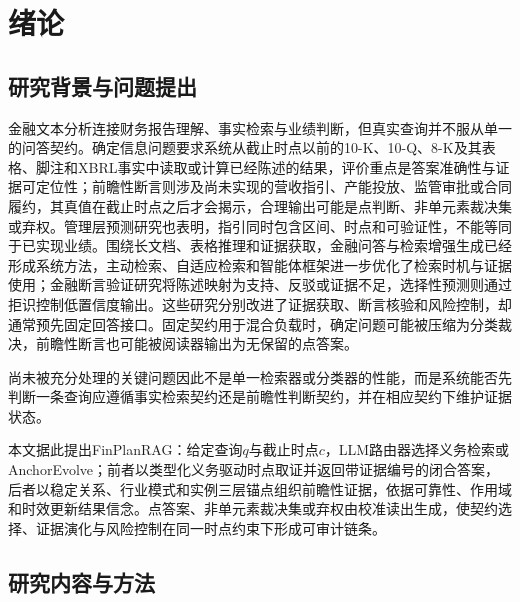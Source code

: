 \chapter{绪论}
\label{ch:intro}

\section{研究背景与问题提出}

金融文本分析连接财务报告理解、事实检索与业绩判断，但真实查询并不服从单一的问答契约。确定信息问题要求系统从截止时点以前的10-K、10-Q、8-K及其表格、脚注和XBRL事实中读取或计算已经陈述的结果，评价重点是答案准确性与证据可定位性；前瞻性断言则涉及尚未实现的营收指引、产能投放、监管审批或合同履约，其真值在截止时点之后才会揭示，合理输出可能是点判断、非单元素裁决集或弃权。管理层预测研究也表明，指引同时包含区间、时点和可验证性，不能等同于已实现业绩\citep{hirst2008management}。围绕长文档、表格推理和证据获取，金融问答与检索增强生成已经形成系统方法\citep{lewis2020rag,chen2021finqa,zhu2021tatqa,islam2023financebench,reddy2024docfinqa}，主动检索、自适应检索和智能体框架进一步优化了检索时机与证据使用\citep{jiang2023flare,jeong2024adaptiverag,yao2023react,shinn2023reflexion}；金融断言验证研究将陈述映射为支持、反驳或证据不足\citep{zhao2024findver,rangapur2025finfact}，选择性预测则通过拒识控制低置信度输出\citep{chow1970optimum,geifman2017selective}。这些研究分别改进了证据获取、断言核验和风险控制，却通常预先固定回答接口。固定契约用于混合负载时，确定问题可能被压缩为分类裁决，前瞻性断言也可能被阅读器输出为无保留的点答案。

尚未被充分处理的关键问题因此不是单一检索器或分类器的性能，而是系统能否先判断一条查询应遵循事实检索契约还是前瞻性判断契约，并在相应契约下维护证据状态。

本文据此提出FinPlanRAG：给定查询$q$与截止时点$c$，LLM路由器选择义务检索或AnchorEvolve；前者以类型化义务驱动时点取证并返回带证据编号的闭合答案，后者以稳定关系、行业模式和实例三层锚点组织前瞻性证据，依据可靠性、作用域和时效更新结果信念。点答案、非单元素裁决集或弃权由校准读出生成，使契约选择、证据演化与风险控制在同一时点约束下形成可审计链条。

\section{研究内容与方法}

